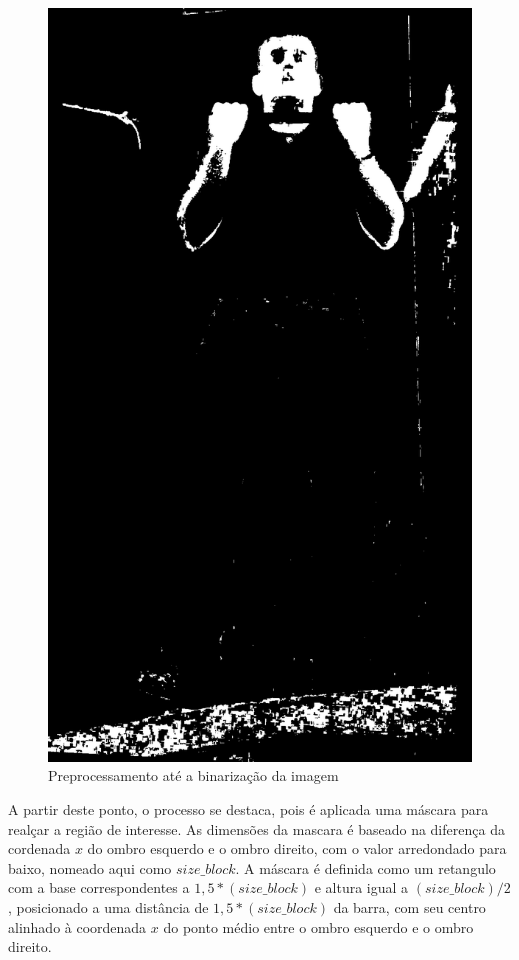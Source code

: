 \begin{figure}[!htbp]
\begin{minipage}{\sizeImg\textwidth}
            \includegraphics[width=\textwidth]{figuras/ultrapassar_barra/134_limited.png}
        \end{minipage}
    \caption{Preprocessamento até a binarização da imagem}
    \label{fig:bin_ultrapassar_barra}
\end{figure}
\renewcommand{\sizeImg}{0.4}
\newpage

 A partir deste ponto, o processo se destaca, pois é aplicada uma máscara para realçar a região de interesse. As dimensões da mascara é baseado na diferença da cordenada $x$ do ombro esquerdo e o ombro direito, com o valor arredondado para baixo, nomeado aqui como $size\_block$. A máscara é definida como um retangulo com a base correspondentes a  $1,5*(size\_block)$ e altura igual a  $(size\_block)/2$, posicionado a uma distância de  $1,5*(size\_block)$ da barra, com seu centro alinhado à coordenada $x$ do ponto médio entre o ombro esquerdo e o ombro direito.
 
